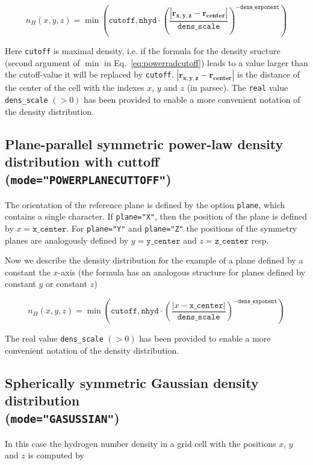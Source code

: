 \documentclass[a4paper,10pt]{article}
\begin{document}
\begin{equation}
 n_H(x,y,z) = \min \left(\mathtt{cutoff}, 
\mathtt{nhyd} \cdot \left(
 \frac{\left|\mathbf{r_{x,y,z}} - 
\mathbf{r_{center}} \right|}{\mathtt{dens\_scale}}
\right)^{- \mathtt{dens\_exponent}}\right)
\label{eq:powerradcutoff}
\end{equation}

Here \texttt{cutoff} is maximal density, i.e. if the formula for the density
sructure (second argument of $\min$ in Eq.~\ref{eq:powerradcutoff}) leads to a 
value larger than the cutoff-value it will be replaced by \texttt{cutoff}.  
$\left|\mathbf{r_{x,y,z}} - \mathbf{r_{center}} \right|$ is the
distance of the center of the cell with the indexes $x$, $y$ and $z$ (in 
parsec). The \texttt{real} value \texttt{dens\_scale} $(>0)$ has been provided 
to enable a more convenient notation of the density distribution.


\subsection{Plane-parallel symmetric power-law density distribution with 
cuttoff (\texttt{mode="POWERPLANECUTTOFF"})}

The orientation of the reference plane is defined by the option \texttt{plane}, 
which contains a single character. If \texttt{plane="X"}, then the 
position of the plane is defined by $x=\mathtt{x\_center}$. For 
\texttt{plane="Y"} and 
\texttt{plane="Z"} the positions of the symmetry planes are analogously 
defined by  $y=\mathtt{y\_center}$  and  $z=\mathtt{z\_center}$ resp.

Now we describe the density distribution for the example of a plane defined by 
a constant the $x$-axis (the formula has an analogous structure for planes 
defined by constant $y$ or constant $z$)

\begin{equation}
 n_H(x,y,z) = \min \left(\mathtt{cutoff}, 
 \mathtt{nhyd} \cdot \left(
 \frac{\left|x - 
 \texttt{x\_center} \right|}{\mathtt{dens\_scale}}
\right)^{- \mathtt{dens\_exponent}}\right)
\label{eq:powerplanecutoff}
\end{equation}



The real value \texttt{dens\_scale} $(>0)$ has been provided to 
enable a more convenient notation of the density distribution.

\subsection{Spherically symmetric Gaussian density distribution\\
(\texttt{mode="GASUSSIAN"})}
In this case the hydrogen number density in a grid cell with the positions $x$, 
$y$ and $z$ is computed by
\end{document}
